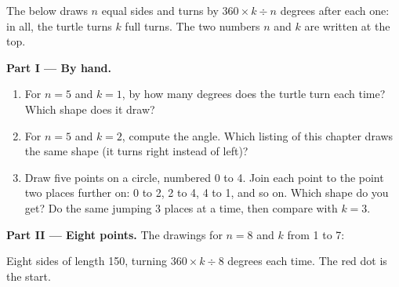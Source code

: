 \begin{problem}\label{pb:g6:for-loops-turtle:1}
The  below draws $n$ equal sides and turns by $360 \times k \div n$
degrees after each one: in all, the turtle turns $k$ full turns. The two numbers
$n$ and $k$ are written at the top.

\label{lst:g6:for-loops-turtle:stars}

\medskip\noindent\textbf{Part I --- By hand.}
\begin{enumerate}
  \item For $n = 5$ and $k = 1$, by how many degrees does the turtle turn each
    time? Which shape does it draw?
  \item For $n = 5$ and $k = 2$, compute the angle. Which listing of this
    chapter draws the same shape (it turns right instead of left)?
  \item Draw five points on a circle, numbered 0 to 4. Join each point to the
    point two places further on: 0 to 2, 2 to 4, 4 to 1, and so on. Which shape
    do you get? Do the same jumping 3 places at a time, then compare with
    $k = 3$.
\end{enumerate}

\medskip\noindent\textbf{Part II --- Eight points.} The drawings for $n = 8$
and $k$ from 1 to 7:

\begin{omfigure}

{\small Eight sides of length 150, turning $360 \times k \div 8$ degrees each
time. The red dot is the start.}
\end{omfigure}


\end{problem}
